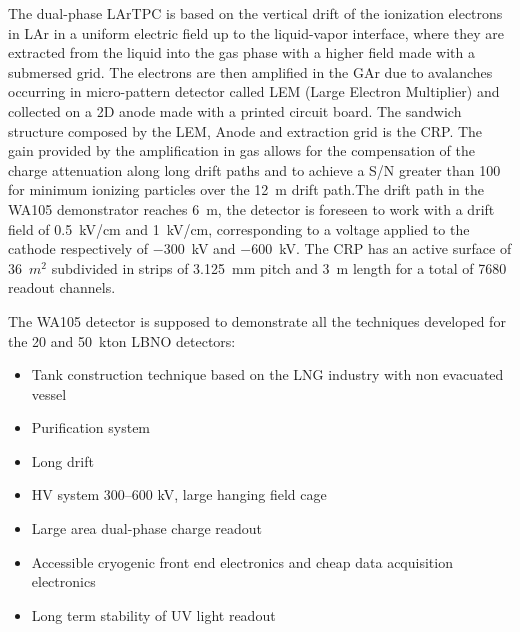 The dual-phase LArTPC is based on the vertical drift of the
ionization electrons in LAr in a uniform electric field up to the
liquid-vapor interface, where they are extracted from the liquid into
the gas phase with a higher field made with a submersed grid. The
electrons are then amplified in the GAr due to avalanches occurring
in micro-pattern detector called LEM (Large Electron Multiplier) and
collected on a 2D anode made with a printed circuit board. The
sandwich structure composed by the LEM, Anode and extraction
grid is the CRP. The gain provided by the
amplification in gas allows for the compensation of the charge
attenuation along long drift paths and to achieve a S/N greater than
100 for minimum ionizing particles over the 12~m drift path.The drift path
in the WA105 demonstrator reaches 6~m, the detector is foreseen to
work with a drift field of 0.5~kV/cm and 1~kV/cm, corresponding to a
voltage applied to the cathode respectively of $-$300~kV and $-$600~kV. The
CRP has an active surface of 36~$m^2$ subdivided in strips of 3.125~mm
pitch and 3~m length for a total of 7680 readout channels.

The WA105 detector is supposed to demonstrate all the techniques developed for the 20 and 50~kton LBNO detectors:
\begin{itemize}
\item{Tank construction technique based on the LNG industry with non evacuated vessel}
\item{Purification system}
\item{Long drift}
\item{HV system 300--600 kV, large hanging field cage}
\item{Large area dual-phase charge readout}
\item{Accessible cryogenic front end electronics and cheap data acquisition electronics}
\item{Long term stability of UV light readout}
\end{itemize}

